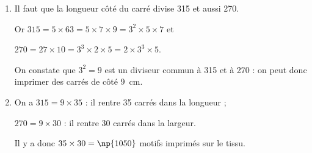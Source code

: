 \documentclass[10pt]{article}
\begin{document}
\begin{enumerate}
	\begin{enumerate}
		\item %
		
Il faut que la longueur côté du carré divise 315 et aussi 270.

Or $315 = 5 \times 63 = 5 \times 7 \times 9 = 3^2 \times 5 \times 7$ et 

$270 = 27 \times 10 = 3^3 \times 2 \times 5 = 2 \times 3^3 \times 5$.

On constate que $3^2 = 9$ est un diviseur commun à 315 et à 270 : on peut donc imprimer des carrés de côté 9~cm.
		\item %
		
On a $315 = 9 \times 35$ : il rentre 35 carrés dans la longueur ;

$270 = 9 \times 30$ : il rentre 30 carrés dans la largeur.

Il y a donc $35 \times 30 = \np{1050}$ motifs imprimés sur le tissu.
	\end{enumerate}
\end{enumerate}

\bigskip
\end{document}
